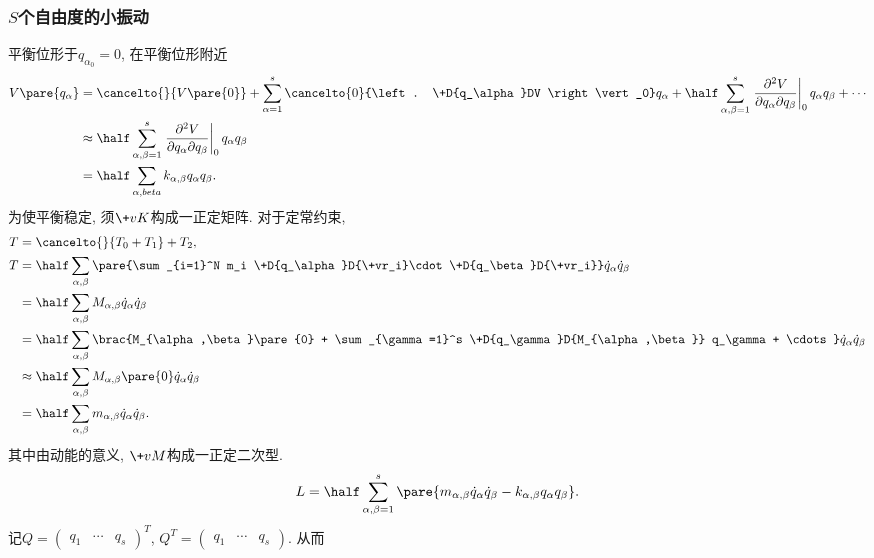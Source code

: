 \documentclass[../LectureNotes.tex]{subfiles}
\begin{document}

\subsubsection{\texorpdfstring{$S$}{S}个自由度的小振动} %
\label{ssub:s个自由度的小振动}

平衡位形于$q_{\alpha_0} = 0$, 在平衡位形附近
\begin{align*}
    V\pare{q_\alpha} &= \cancelto{}{V\pare{0}} + \sum_{\alpha=1}^s \cancelto{0}{\left. \+D{q_\alpha}DV \right\vert_0} q_\alpha + \half\sum_{\alpha,\beta=1}^s \left. \frac{\partial^2 V}{\partial q_\alpha \partial q_\beta} \right\vert_0 q_\alpha q_\beta + \cdots \\
    &\approx \half\sum_{\alpha,\beta=1}^s \left. \frac{\partial^2 V}{\partial q_\alpha \partial q_\beta} \right\vert_0 q_\alpha q_\beta \\
    &= \half \sum_{\alpha,beta} k_{\alpha,\beta} q_\alpha q_\beta.
\end{align*}
为使平衡稳定, 须$\+vK$构成一正定矩阵. 对于定常约束,
\begin{align*}
    T &= \cancelto{}{T_0 + T_1} + T_2, \\
    T &= \half \sum_{\alpha,\beta} \pare{\sum_{i=1}^N m_i \+D{q_\alpha}D{\+vr_i}\cdot \+D{q_\beta}D{\+vr_i}} \dot{q}_\alpha \dot{q}_\beta\\
    &= \half \sum_{\alpha,\beta} M_{\alpha,\beta}\dot{q}_\alpha \dot{q}_\beta \\
    &= \half \sum_{\alpha,\beta} \brac{M_{\alpha,\beta}\pare{0} + \sum_{\gamma=1}^s \+D{q_\gamma}D{M_{\alpha,\beta}} q_\gamma + \cdots}\dot{q}_\alpha \dot{q}_\beta \\
    &\approx \half \sum_{\alpha,\beta} M_{\alpha,\beta}\pare{0} \dot{q}_\alpha \dot{q}_\beta \\
    &= \half \sum_{\alpha,\beta} m_{\alpha,\beta}\dot{q}_\alpha \dot{q}_\beta.
\end{align*}
其中由动能的意义, $\+vM$构成一正定二次型.
\[ L = \half \sum_{\alpha,\beta=1}^s \pare{m_{\alpha,\beta} \dot{q}_\alpha \dot{q}_\beta - k_{\alpha,\beta}q_\alpha q_\beta}. \]
记$Q = \begin{pmatrix}
    q_1 & \cdots & q_s
\end{pmatrix}^T$, $Q^T = \begin{pmatrix}
    q_1 & \cdots & q_s
\end{pmatrix}$. 从而
\end{document}
